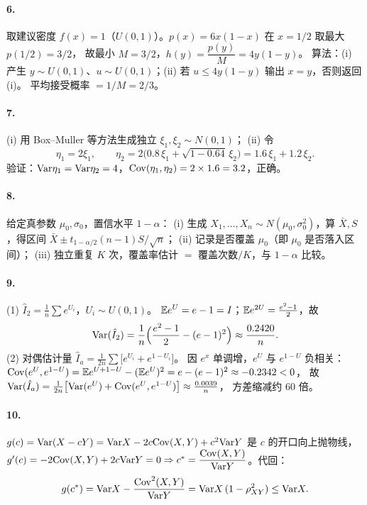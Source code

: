 \paragraph{6.}
取建议密度 $f(x)=1$（$U(0,1)$）。$p(x)=6x(1-x)$ 在 $x=1/2$ 取最大 $p(1/2)=3/2$，
故最小 $M=3/2$，$h(y)=\dfrac{p(y)}{M}=4y(1-y)$。
算法：(i) 产生 $y\sim U(0,1)$、$u\sim U(0,1)$；(ii) 若 $u\le 4y(1-y)$ 输出 $x=y$，否则返回 (i)。
平均接受概率 $=1/M=2/3$。

\paragraph{7.}
(i) 用 Box--Muller 等方法生成独立 $\xi_1,\xi_2\sim N(0,1)$；
(ii) 令
\[
\eta_1=2\xi_1,\qquad \eta_2=2\big(0.8\,\xi_1+\sqrt{1-0.64}\,\xi_2\big)=1.6\,\xi_1+1.2\,\xi_2 .
\]
验证：$\mathrm{Var}\eta_1=\mathrm{Var}\eta_2=4$，$\mathrm{Cov}(\eta_1,\eta_2)=2\times1.6=3.2$，正确。

\paragraph{8.}
给定真参数 $\mu_0,\sigma_0$，置信水平 $1-\alpha$：
(i) 生成 $X_1,\dots,X_n\sim N(\mu_0,\sigma_0^2)$，算 $\bar X,S$，得区间
$\bar X\pm t_{1-\alpha/2}(n-1)S/\sqrt n$；
(ii) 记录是否覆盖 $\mu_0$（即 $\mu_0$ 是否落入区间）；
(iii) 独立重复 $K$ 次，覆盖率估计 $=$ 覆盖次数$/K$，与 $1-\alpha$ 比较。

\paragraph{9.}
(1) $\hat I_2=\frac1n\sum e^{U_i}$，$U_i\sim U(0,1)$。
$\mathbb{E} e^U=e-1=I$；$\mathbb{E} e^{2U}=\frac{e^2-1}{2}$，故
\[
\mathrm{Var}(\hat I_2)=\frac1n\Big(\frac{e^2-1}{2}-(e-1)^2\Big)\approx\frac{0.2420}{n}.
\]
(2) 对偶估计量 $\hat I_a=\frac{1}{2n}\sum\big[e^{U_i}+e^{1-U_i}\big]$。
因 $e^x$ 单调增，$e^{U}$ 与 $e^{1-U}$ 负相关：
$\mathrm{Cov}(e^U,e^{1-U})=\mathbb{E} e^{U+1-U}-(\mathbb{E} e^U)^2=e-(e-1)^2\approx-0.2342<0$，
故 $\mathrm{Var}(\hat I_a)=\frac{1}{2n}\big[\mathrm{Var}(e^U)+\mathrm{Cov}(e^U,e^{1-U})\big]\approx\frac{0.0039}{n}$，
方差缩减约 $60$ 倍。

\paragraph{10.}
$g(c)=\mathrm{Var}(X-cY)=\mathrm{Var} X-2c\mathrm{Cov}(X,Y)+c^2\mathrm{Var} Y$ 是 $c$ 的开口向上抛物线，
$g'(c)=-2\mathrm{Cov}(X,Y)+2c\mathrm{Var} Y=0\Rightarrow c^*=\dfrac{\mathrm{Cov}(X,Y)}{\mathrm{Var} Y}$。代回：
\[
g(c^*)=\mathrm{Var} X-\frac{\mathrm{Cov}^2(X,Y)}{\mathrm{Var} Y}=\mathrm{Var} X\,(1-\rho_{XY}^2)\le\mathrm{Var} X .
\]

